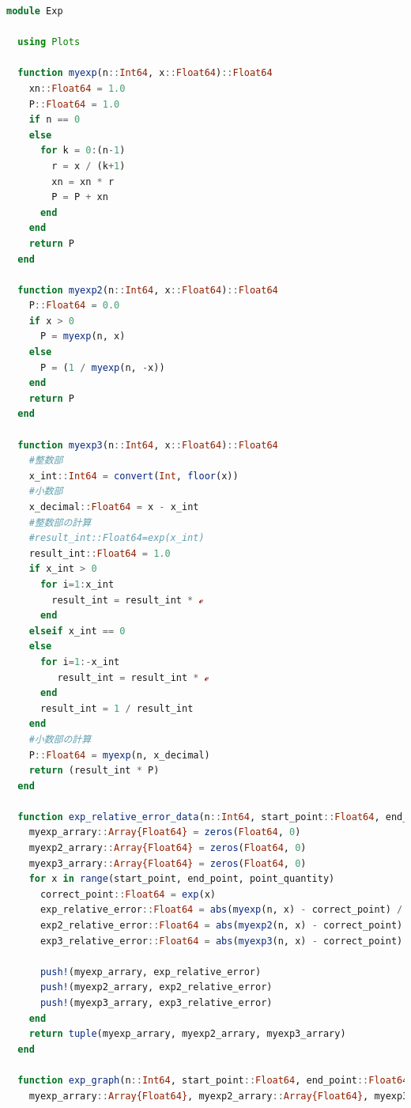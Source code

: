 \documentclass[uplatex, dvipdfmx, a4j,11pt]{jsarticle}
\begin{document}
\newpage
{}
\begin{lstlisting}[title={課題4}, label=code:in, language=Julia]
module Exp

  using Plots

  function myexp(n::Int64, x::Float64)::Float64
    xn::Float64 = 1.0
    P::Float64 = 1.0
    if n == 0
    else
      for k = 0:(n-1)
        r = x / (k+1)
        xn = xn * r
        P = P + xn
      end
    end
    return P
  end

  function myexp2(n::Int64, x::Float64)::Float64
    P::Float64 = 0.0
    if x > 0
      P = myexp(n, x)
    else
      P = (1 / myexp(n, -x))
    end
    return P
  end

  function myexp3(n::Int64, x::Float64)::Float64
    #整数部
    x_int::Int64 = convert(Int, floor(x))
    #小数部
    x_decimal::Float64 = x - x_int
    #整数部の計算
    #result_int::Float64=exp(x_int)
    result_int::Float64 = 1.0
    if x_int > 0
      for i=1:x_int
        result_int = result_int * ℯ
      end
    elseif x_int == 0
    else
      for i=1:-x_int
         result_int = result_int * ℯ
      end
      result_int = 1 / result_int
    end
    #小数部の計算
    P::Float64 = myexp(n, x_decimal)
    return (result_int * P)
  end

  function exp_relative_error_data(n::Int64, start_point::Float64, end_point::Float64, point_quantity::Int64)::Tuple{Array{Float64}, Array{Float64}, Array{Float64}}
    myexp_arrary::Array{Float64} = zeros(Float64, 0) 
    myexp2_arrary::Array{Float64} = zeros(Float64, 0) 
    myexp3_arrary::Array{Float64} = zeros(Float64, 0) 
    for x in range(start_point, end_point, point_quantity)
      correct_point::Float64 = exp(x)
      exp_relative_error::Float64 = abs(myexp(n, x) - correct_point) / abs(correct_point)
      exp2_relative_error::Float64 = abs(myexp2(n, x) - correct_point) / abs(correct_point)
      exp3_relative_error::Float64 = abs(myexp3(n, x) - correct_point) / abs(correct_point)

      push!(myexp_arrary, exp_relative_error)
      push!(myexp2_arrary, exp2_relative_error)
      push!(myexp3_arrary, exp3_relative_error)
    end
    return tuple(myexp_arrary, myexp2_arrary, myexp3_arrary)
  end

  function exp_graph(n::Int64, start_point::Float64, end_point::Float64, point_quantity::Int64, png::String)
    myexp_arrary::Array{Float64}, myexp2_arrary::Array{Float64}, myexp3_arrary::Array{Float64} = exp_relative_error_data(n, start_point, end_point, point_quantity) 


\end{lstlisting}
\end{document}
